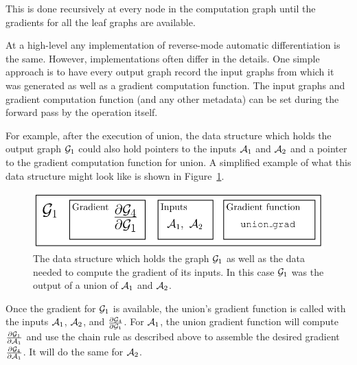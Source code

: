 This is done recursively at every node in the computation graph until the
gradients for all the leaf graphs are available.

At a high-level any implementation of reverse-mode automatic differentiation is
the same. However, implementations often differ in the details. One simple
approach is to have every output graph record the input graphs from which it
was generated as well as a gradient computation function. The input graphs and
gradient computation function (and any other metadata) can be set during the
forward pass by the operation itself.

For example, after the execution of union, the data structure which holds the
output graph $\mathcal{G}_1$ could also hold pointers to the inputs $\mathcal{A}_1$ and $\mathcal{A}_2$
and a pointer to the gradient computation function for union. A simplified
example of what this data structure might look like is shown in
Figure~\ref{fig:grad_data}.

\begin{figure}
    \centering
    \includegraphics[scale=0.9]{figures/grad_data}
    \caption{The data structure which holds the graph $\mathcal{G}_1$ as well as the
    data needed to compute the gradient of its inputs. In this case $\mathcal{G}_1$ was
    the output of a union of $\mathcal{A}_1$ and $\mathcal{A}_2$.}
    \label{fig:grad_data}
\end{figure}

Once the gradient for $\mathcal{G}_1$ is available, the union's gradient function is
called with the inputs $\mathcal{A}_1$, $\mathcal{A}_2$, and $\frac{\partial \mathcal{G}_4}{\partial
\mathcal{G}_1}$. For $\mathcal{A}_1$, the union gradient function will compute $\frac{\partial
\mathcal{G}_1}{\partial \mathcal{A}_1}$ and use the chain rule as described above to assemble
the desired gradient $\frac{\partial \mathcal{G}_4}{\partial \mathcal{A}_1}$. It will do the
same for $\mathcal{A}_2$.
